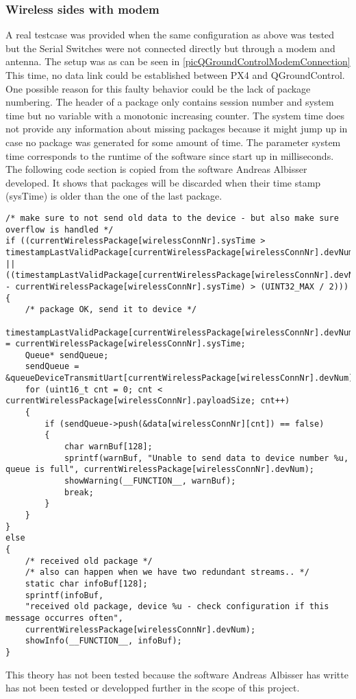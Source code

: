 \subsubsection{Wireless sides with modem}
%
A real testcase was provided when the same configuration as above was tested but the Serial Switches were not connected directly but through a modem and antenna. The setup was as can be seen in \autoref{picQGroundControlModemConnection}
This time, no data link could be established between PX4 and QGroundControl. One possible reason for this faulty behavior could be the lack of package numbering. The header of a package only contains session number and system time but no variable with a monotonic increasing counter. The system time does not provide any information about missing packages because it might jump up in case no package was generated for some amount of time. The parameter system time corresponds to the runtime of the software since start up in milliseconds.\\
The following code section is copied from the software Andreas Albisser developed. It shows that packages will be discarded when their time stamp (sysTime) is older than the one of the last package.
%
\begin{lstlisting}
/* make sure to not send old data to the device - but also make sure overflow is handled */
if ((currentWirelessPackage[wirelessConnNr].sysTime > timestampLastValidPackage[currentWirelessPackage[wirelessConnNr].devNum]) ||
((timestampLastValidPackage[currentWirelessPackage[wirelessConnNr].devNum] - currentWirelessPackage[wirelessConnNr].sysTime) > (UINT32_MAX / 2)))
{
    /* package OK, send it to device */
    timestampLastValidPackage[currentWirelessPackage[wirelessConnNr].devNum] = currentWirelessPackage[wirelessConnNr].sysTime;
    Queue* sendQueue;
    sendQueue = &queueDeviceTransmitUart[currentWirelessPackage[wirelessConnNr].devNum];
    for (uint16_t cnt = 0; cnt < currentWirelessPackage[wirelessConnNr].payloadSize; cnt++)
    {
        if (sendQueue->push(&data[wirelessConnNr][cnt]) == false)
        {
            char warnBuf[128];
            sprintf(warnBuf, "Unable to send data to device number %u, queue is full", currentWirelessPackage[wirelessConnNr].devNum);
            showWarning(__FUNCTION__, warnBuf);
            break;
        }
    }
}
else
{
    /* received old package */
    /* also can happen when we have two redundant streams.. */
    static char infoBuf[128];
    sprintf(infoBuf, 
    "received old package, device %u - check configuration if this message occurres often",
    currentWirelessPackage[wirelessConnNr].devNum);
    showInfo(__FUNCTION__, infoBuf);
}
\end{lstlisting}
%
This theory has not been tested because the software Andreas Albisser has writte has not been tested or developped further in the scope of this project.\\
%
%
